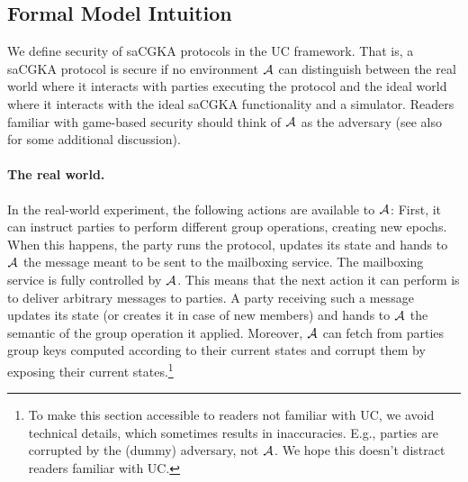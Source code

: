\subsection{Formal Model Intuition}
We define security of saCGKA protocols in the UC framework. That is, a saCGKA protocol is secure if no environment $\mathcal{A}_{\relax}$ can distinguish between the real world where it interacts with parties executing the protocol and the ideal world where it interacts with the ideal saCGKA functionality and a simulator. Readers familiar with game-based security should think of $\mathcal{A}_{\relax}$ as the adversary (see also~\cite{EPRINT:AHKM21} for some additional discussion).

\paragraph{The real world.}
In the real-world experiment, the following actions are available to $\mathcal{A}_{\relax}$: First, it can instruct parties to perform
different group operations, creating new epochs. When this happens, the party runs the protocol, updates its state and
hands to $\mathcal{A}_{\relax}$ the message meant to be sent to the mailboxing service. The mailboxing service is fully controlled by
$\mathcal{A}_{\relax}$. This means that the next action it can perform is to deliver arbitrary messages to parties. A party receiving
such a message updates its state (or creates it in case of new members) and hands to $\mathcal{A}_{\relax}$ the semantic of the group operation it applied. Moreover, $\mathcal{A}_{\relax}$ can fetch from parties group keys computed according to their current states and corrupt them by exposing their current states.\footnote{To
	make this section accessible to readers not familiar with UC, we avoid technical details, which sometimes results in inaccuracies. E.g., parties are corrupted by the (dummy) adversary, not $\mathcal{A}_{\relax}$. We hope this doesn't distract readers familiar with UC.}


